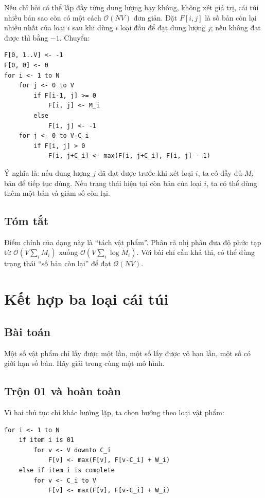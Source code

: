 \documentclass[11pt]{article}
\newcommand{\Oh}{\mathcal{O}}
\begin{document}
Nếu chỉ hỏi có thể lấp đầy từng dung lượng hay không, không xét giá trị, cái
túi nhiều bản sao còn có một cách \(\Oh(NV)\) đơn giản. Đặt \(F[i,j]\) là số
bản còn lại nhiều nhất của loại \(i\) sau khi dùng \(i\) loại đầu để đạt dung
lượng \(j\); nếu không đạt được thì bằng \(-1\). Chuyển:
\begin{verbatim}
F[0, 1..V] <- -1
F[0, 0] <- 0
for i <- 1 to N
    for j <- 0 to V
        if F[i-1, j] >= 0
            F[i, j] <- M_i
        else
            F[i, j] <- -1
    for j <- 0 to V-C_i
        if F[i, j] > 0
            F[i, j+C_i] <- max(F[i, j+C_i], F[i, j] - 1)
\end{verbatim}

Ý nghĩa là: nếu dung lượng \(j\) đã đạt được trước khi xét loại \(i\), ta có
đầy đủ \(M_i\) bản để tiếp tục dùng. Nếu trạng thái hiện tại còn bản của loại
\(i\), ta có thể dùng thêm một bản và giảm số còn lại.

\subsection{Tóm tắt}

Điểm chính của dạng này là ``tách vật phẩm''. Phân rã nhị phân đưa độ phức tạp
từ \(\Oh(V\sum_i M_i)\) xuống \(\Oh(V\sum_i\log M_i)\). Với bài chỉ cần khả
thi, có thể dùng trạng thái ``số bản còn lại'' để đạt \(\Oh(NV)\).

\section{Kết hợp ba loại cái túi}

\subsection{Bài toán}

Một số vật phẩm chỉ lấy được một lần, một số lấy được vô hạn lần, một số có
giới hạn số bản. Hãy giải trong cùng một mô hình.

\subsection{Trộn 01 và hoàn toàn}

Vì hai thủ tục chỉ khác hướng lặp, ta chọn hướng theo loại vật phẩm:
\begin{verbatim}
for i <- 1 to N
    if item i is 01
        for v <- V downto C_i
            F[v] <- max(F[v], F[v-C_i] + W_i)
    else if item i is complete
        for v <- C_i to V
            F[v] <- max(F[v], F[v-C_i] + W_i)
\end{verbatim}
\end{document}
